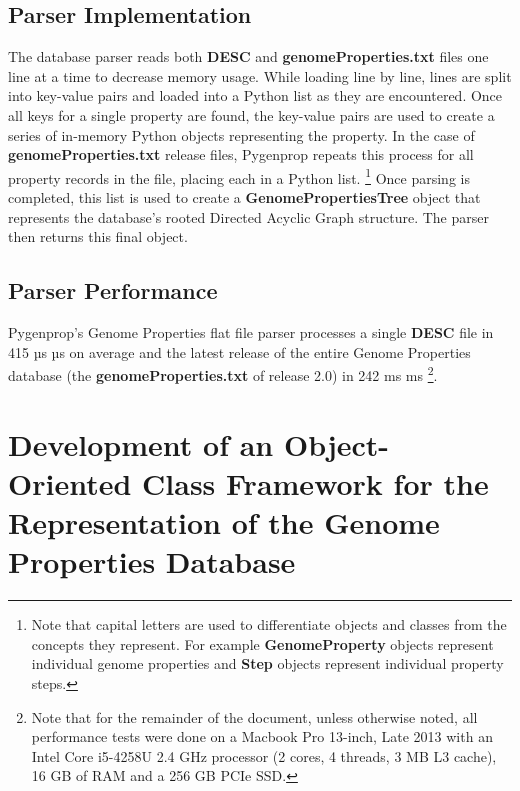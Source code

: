 \subsection{Parser Implementation}

The database parser reads both \textbf{DESC} and \textbf{genomeProperties.txt} files one line at a time to decrease memory usage. While loading line by line, lines are split into key-value pairs and loaded into a Python list as they are encountered. Once all keys for a single property are found, the key-value pairs are used to create a series of in-memory Python objects representing the property. In the case of \textbf{genomeProperties.txt} release files, Pygenprop repeats this process for all property records in the file, placing each in a Python list. \footnote{Note that capital letters are used to differentiate objects and classes from the concepts they represent. For example \textbf{GenomeProperty} objects represent individual genome properties and \textbf{Step} objects represent individual property steps.} Once parsing is completed, this list is used to create a \textbf{GenomePropertiesTree} object that represents the database's rooted Directed Acyclic Graph structure. The parser then returns this final object.

\subsection{Parser Performance}

Pygenprop's Genome Properties flat file parser processes a single \textbf{DESC} file in 415 µs  µs on average and the latest release of the entire Genome Properties database (the \textbf{genomeProperties.txt} of release 2.0) in 242 ms  ms \footnote{Note that for the remainder of the document, unless otherwise noted, all performance tests were done on a Macbook Pro 13-inch, Late 2013 with an Intel Core i5-4258U 2.4 GHz processor (2 cores, 4 threads, 3 MB L3 cache), 16 GB of RAM and a 256 GB PCIe SSD.}.

\section{Development of an Object-Oriented Class Framework for the Representation of the Genome Properties Database} \label{genomeprop-oop}


